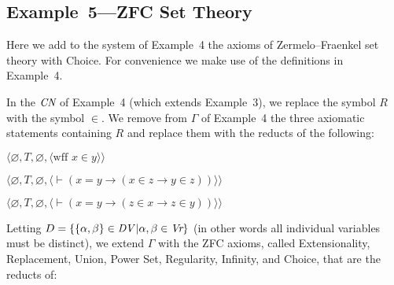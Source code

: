 \subsection{Example~5---ZFC Set Theory}

Here we add to the system of Example~4 the axioms of Zermelo--Fraenkel set
theory with Choice.  For convenience we make use of the
definitions in Example~4.

In the $\mbox{\em CN}$ of Example~4 (which extends Example~3), we replace the symbol $R$
with the symbol $\in$.  We remove from $\Gamma$ of Example~4 the three
axiomatic statements containing $R$ and replace them with the
reducts of the following:
\begin{list}{}{\itemsep 0.0pt}
      \item[] $\langle\varnothing,T,\varnothing,
               \langle \mbox{wff\ }x\in y\rangle\rangle$
      \item[] $\langle\varnothing,T,
               \varnothing,
               \langle \vdash(x=y\to(x\in z\to y\in z))\rangle\rangle$
      \item[] $\langle\varnothing,T,
               \varnothing,
               \langle \vdash(x=y\to(z\in x\to z\in y))\rangle\rangle$
\end{list}
Letting $D=\{\{\alpha,\beta\}\in \mbox{\em DV}\,|\alpha,\beta\in \mbox{\em
Vr}\}$ (in other words all individual variables must be distinct), we extend
$\Gamma$ with the ZFC axioms, called
Extensionality, Replacement, Union, Power
Set, Regularity, Infinity, and Choice, that are the reducts of:
